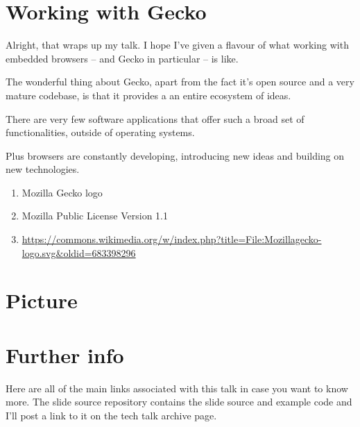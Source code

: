 \documentclass{article}
\begin{document}

\section{Working with Gecko}

Alright, that wraps up my talk. I hope I've given a flavour of what working with embedded browsers -- and Gecko in particular -- is like.

The wonderful thing about Gecko, apart from the fact it's open source and a very mature codebase, is that it provides a an entire ecosystem of ideas.

There are very few software applications that offer such a broad set of functionalities, outside of operating systems.

Plus browsers are constantly developing, introducing new ideas and building on new technologies.

\begin{enumerate}
\item Mozilla Gecko logo
\item Mozilla Public License Version 1.1
\item \url{https://commons.wikimedia.org/w/index.php?title=File:Mozillagecko-logo.svg&oldid=683398296}
\end{enumerate}


\section{Picture}


\section{Further info}
Here are all of the main links associated with this talk in case you want to know more. The slide source repository contains the slide source and example code and I'll post a link to it on the tech talk archive page.

\fontsize{7pt}{8pt}{}


\end{document}
